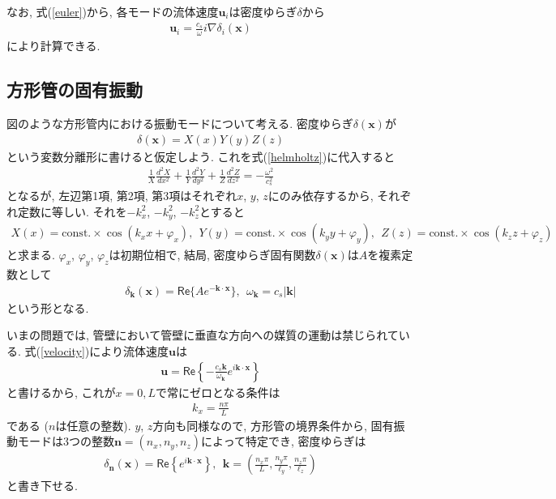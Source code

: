 \documentclass[a4paper,uplatex,dvipdfmx]{jsarticle}
\newcommand{\x}{\bm{x}}
\renewcommand{\k}{\bm{k}}
\renewcommand{\u}{\bm{u}}
\newcommand{\n}{\textbf{n}}
\begin{document}
なお, 式(\ref{euler})から, 各モードの流体速度$\u_i$は密度ゆらぎ$\delta$から
\begin{align}
	\u_i = \frac{ c_s }{ \omega } i \nabla \delta_i ( \x ) \label{velocity}
\end{align}
により計算できる.

\subsection{方形管の固有振動}

図のような方形管内における振動モードについて考える. 密度ゆらぎ$\delta ( \x )$が
\begin{align*}
	\delta ( \x ) = X ( x ) Y ( y ) Z ( z )
\end{align*}
という変数分離形に書けると仮定しよう. これを式(\ref{helmholtz})に代入すると
\begin{align*}
	\frac{ 1 }{ X } \frac{ d^2 X }{ d x^2 } + \frac{ 1 }{ Y } \frac{ d^2 Y }{ d y^2 }
	+ \frac{ 1 }{ Z } \frac{ d^2 Z }{ d z^2 } = - \frac{ \omega^2 }{ c_s^2 }
\end{align*}
となるが, 左辺第1項, 第2項, 第3項はそれぞれ$x$, $y$, $z$にのみ依存するから, それぞれ定数に等しい.
それを$- k_x^2$, $- k_y^2$, $- k_z^2$とすると
\begin{align*}
	X ( x ) = \mathrm{const.} \times \cos ( k_x x + \varphi_x ) , \ \
	Y ( y ) = \mathrm{const.} \times \cos ( k_y y + \varphi_y ) , \ \
	Z ( z ) = \mathrm{const.} \times \cos ( k_z z + \varphi_z )
\end{align*}
と求まる. $\varphi_x$, $\varphi_y$, $\varphi_z$は初期位相で, 結局, 密度ゆらぎ固有関数$\delta ( \x )$は$A$を複素定数として
\begin{align}
	\delta_{\k} ( \x ) = \mathsf{Re} \{ A e^{ - \k \cdot \x } \} , \ \
	\omega_{\k} = c_s | \k |
\end{align}
という形となる.

いまの問題では, 管壁において管壁に垂直な方向への媒質の運動は禁じられている.
式(\ref{velocity})により流体速度$\u$は
\begin{align}
	\u = \mathsf{Re} \left\{ - \frac{ c_s \k }{ \omega_{\k} } e^{i \k \cdot \x} \right\}
\end{align}
と書けるから, これが$x = 0, L$で常にゼロとなる条件は
\begin{align*}
	k_x = \frac{ n \pi }{ L }
\end{align*}
である ($n$は任意の整数). $y$, $z$方向も同様なので, 方形管の境界条件から,
固有振動モードは$3$つの整数$\n = ( n_x, n_y, n_z )$によって特定でき, 密度ゆらぎは
\begin{align}
	\delta_{\n} ( \x ) = \mathsf{Re} \left\{ e^{i \k \cdot \x} \right\} , \ \
	\k = \left( \frac{ n_x \pi }{ L }, \frac{ n_y \pi }{ \ell_y }, \frac{ n_z \pi }{ \ell_z } \right)
\end{align}
と書き下せる.
\end{document}

